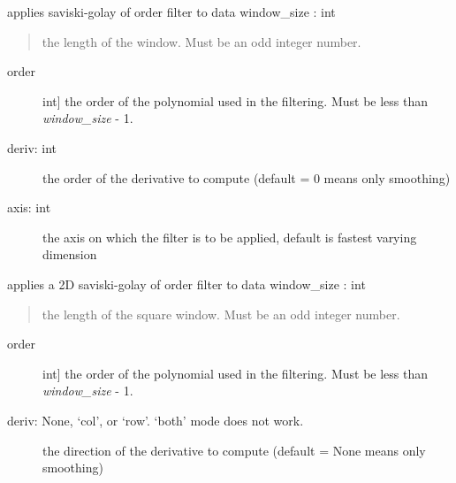 \documentclass[letterpaper,10pt,openany,oneside]{sphinxmanual}
\begin{document}
\begin{fulllineitems}
\begin{fulllineitems}
\end{fulllineitems}


\begin{fulllineitems}
\label{rst/code:NPKData.NPKData.sg}
applies saviski-golay of order filter to data
window\_size : int
\begin{quote}

the length of the window. Must be an odd integer number.
\end{quote}
\begin{description}
\item[{order}] \leavevmode{[}int{]}
the order of the polynomial used in the filtering.
Must be less than \emph{window\_size} - 1.

\item[{deriv: int}] \leavevmode
the order of the derivative to compute (default = 0 means only smoothing)

\item[{axis: int}] \leavevmode
the axis on which the filter is to be applied, default is fastest varying dimension

\end{description}

\end{fulllineitems}


\begin{fulllineitems}
\label{rst/code:NPKData.NPKData.sg2D}
applies a 2D saviski-golay of order filter to data
window\_size : int
\begin{quote}

the length of the square window. Must be an odd integer number.
\end{quote}
\begin{description}
\item[{order}] \leavevmode{[}int{]}
the order of the polynomial used in the filtering.
Must be less than \emph{window\_size} - 1.

\item[{deriv: None, `col', or `row'.   `both' mode does not work.}] \leavevmode
the direction of the derivative to compute (default = None means only smoothing)


\end{description}
\end{fulllineitems}
\end{fulllineitems}
\end{document}
